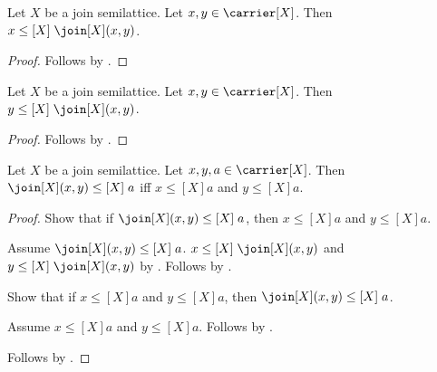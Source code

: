 \begin{proposition}\label{join_upper_left}
    Let $X$ be a join semilattice.
    Let $x,y\in\carrier[X]$.
    Then $x\mathrel{\leq[X]}\join[X](x,y)$.
\end{proposition}
\begin{proof}
    Follows by .
\end{proof}

\begin{proposition}\label{join_upper_right}
    Let $X$ be a join semilattice.
    Let $x,y\in\carrier[X]$.
    Then $y\mathrel{\leq[X]}\join[X](x,y)$.
\end{proposition}
\begin{proof}
    Follows by .
\end{proof}

\begin{proposition}\label{join_leq_iff}
    Let $X$ be a join semilattice.
    Let $x,y,a\in\carrier[X]$.
    Then $\join[X](x,y)\mathrel{\leq[X]}a$ iff
        $x\mathrel{\leq[X]}a$ and $y\mathrel{\leq[X]}a$.
\end{proposition}
\begin{proof}
    Show that if $\join[X](x,y)\mathrel{\leq[X]}a$, then
        $x\mathrel{\leq[X]}a$ and $y\mathrel{\leq[X]}a$.
    \begin{subproof}
        Assume $\join[X](x,y)\mathrel{\leq[X]}a$.
        $x\mathrel{\leq[X]}\join[X](x,y)$ and
            $y\mathrel{\leq[X]}\join[X](x,y)$ by .
        Follows by
            .
    \end{subproof}
    Show that if $x\mathrel{\leq[X]}a$ and $y\mathrel{\leq[X]}a$,
        then $\join[X](x,y)\mathrel{\leq[X]}a$.
    \begin{subproof}
        Assume $x\mathrel{\leq[X]}a$ and $y\mathrel{\leq[X]}a$.
        Follows by .
    \end{subproof}
    Follows by \auto.
\end{proof}

